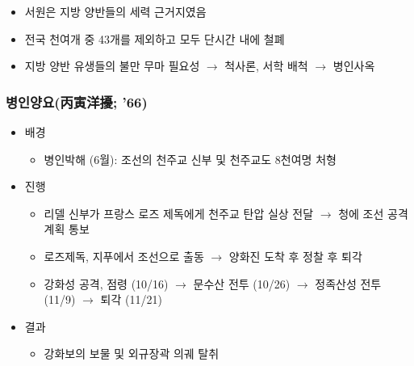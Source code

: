 \begin{itemize}
    \item 서원은 지방 양반들의 세력 근거지였음
    \item 전국 천여개 중 43개를 제외하고 모두 단시간 내에 철폐
    \item 지방 양반 유생들의 불만 무마 필요성 $\rightarrow$ 척사론, 서학 배척 $\rightarrow$ 병인사옥
\end{itemize}
\newpage

\subsubsection*{병인양요(丙寅洋擾; '66)}

\begin{itemize}
    \item 배경
    \begin{itemize}
        \item 병인박해 (6월): 조선의 천주교 신부 및 천주교도 8천여명 처형
    \end{itemize}
    \item 진행
    \begin{itemize}
        \item 리델 신부가 프랑스 로즈 제독에게 천주교 탄압 실상 전달 $\rightarrow$ 청에 조선 공격 계획 통보
        \item 로즈제독, 지푸에서 조선으로 출동 $\rightarrow$ 양화진 도착 후 정찰 후 퇴각
        \item 강화성 공격, 점령 (10/16) $\rightarrow$ 문수산 전투 (10/26) $\rightarrow$ 정족산성 전투 (11/9) $\rightarrow$ 퇴각 (11/21)
    \end{itemize}
    \item 결과
    \begin{itemize}
        \item 강화보의 보물 및 외규장곽 의궤 탈취
    \end{itemize}
\end{itemize}

